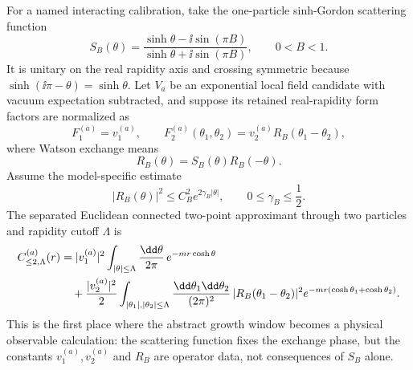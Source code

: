 \begin{controlledapproximation}
\label{ca:sinh-gordon-exponential-two-particle-calibration}
For a named interacting calibration, take the one-particle sinh-Gordon
scattering function
\begin{equation}
  S_B(\theta)
  =
  \frac{\sinh\theta-\ii\sin(\pi B)}
       {\sinh\theta+\ii\sin(\pi B)},
  \qquad 0<B<1.
  \label{eq:sinh-gordon-scattering-function}
\end{equation}
It is unitary on the real rapidity axis and crossing symmetric because
\(\sinh(\ii\pi-\theta)=\sinh\theta\).  Let \(V_a\) be an exponential local
field candidate with vacuum expectation subtracted, and suppose its retained
real-rapidity form factors are normalized as
\[
  F_1^{(a)}=v_1^{(a)},\qquad
  F_2^{(a)}(\theta_1,\theta_2)
  =
  v_2^{(a)}R_B(\theta_1-\theta_2),
\]
where Watson exchange means
\[
  R_B(\theta)=S_B(\theta)R_B(-\theta).
\]
Assume the model-specific estimate
\begin{equation}
  |R_B(\theta)|^2\le C_B^2 e^{2\gamma_B|\theta|},
  \qquad 0\le \gamma_B\le\frac12 .
  \label{eq:sinh-gordon-two-particle-growth-bound}
\end{equation}
The separated Euclidean connected two-point approximant through two
particles and rapidity cutoff \(\Lambda\) is
\begin{align}
  C_{\le2,\Lambda}^{(a)}(r)
  &=
  |v_1^{(a)}|^2
  \int_{|\theta|\le\Lambda}
  \frac{\dd\theta}{2\pi}\,
  e^{-mr\cosh\theta}
  \notag\\
  &\quad+
  \frac{|v_2^{(a)}|^2}{2}
  \int_{|\theta_1|,|\theta_2|\le\Lambda}
  \frac{\dd\theta_1\dd\theta_2}{(2\pi)^2}\,
  |R_B(\theta_1-\theta_2)|^2
  e^{-mr(\cosh\theta_1+\cosh\theta_2)} .
  \label{eq:sinh-gordon-two-particle-approximant}
\end{align}
This is the first place where the abstract growth window becomes a physical
observable calculation: the scattering function fixes the exchange phase, but
the constants \(v_1^{(a)},v_2^{(a)}\) and \(R_B\) are operator data, not
consequences of \(S_B\) alone.


\end{controlledapproximation}
